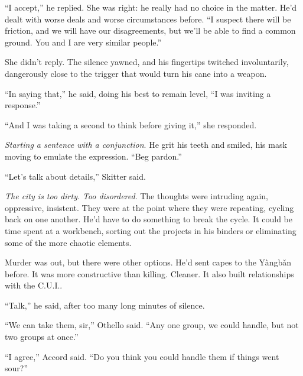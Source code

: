 ``I accept,'' he replied.  She was right: he really had no choice in the matter.  He'd dealt with worse deals and worse circumstances before.  ``I suspect there will be friction, and we will have our disagreements, but we'll be able to find a common ground.  You and I are very similar people.''



She didn't reply.  The silence yawned, and his fingertips twitched involuntarily, dangerously close to the trigger that would turn his cane into a weapon.



``In saying that,'' he said, doing his best to remain level, ``I was inviting a response.''



``And I was taking a second to think before giving it,'' she responded.



\emph{Starting a sentence with a conjunction}.  He grit his teeth and smiled, his mask moving to emulate the expression.  ``Beg pardon.''



``Let's talk about details,'' Skitter said.



\blacksquare



\emph{The city is too dirty. }\emph{Too disordered}.  The thoughts were intruding again, oppressive, insistent.  They were at the point where they were repeating, cycling back on one another.  He'd have to do something to break the cycle.  It could be time spent at a workbench, sorting out the projects in his binders or eliminating some of the more chaotic elements.



Murder was out, but there were other options.  He'd sent capes to the Y\`{a}ngb\v{a}n before.  It was more constructive than killing.  Cleaner.  It also built relationships with the C.U.I..



``Talk,'' he said, after too many long minutes of silence.



``We can take them, sir,'' Othello said.  ``Any one group, we could handle, but not two groups at once.''



``I agree,'' Accord said.  ``Do you think you could handle them if things went sour?''



